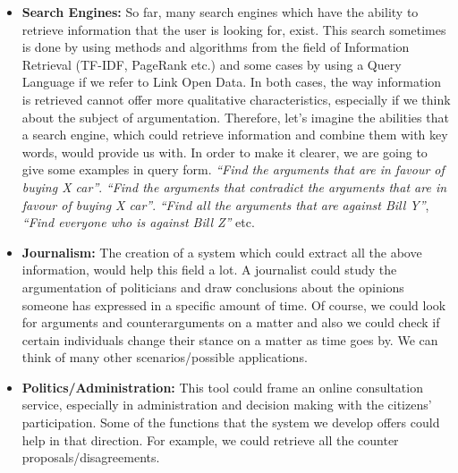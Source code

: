 \begin{itemize}

	\item \textbf{Search Engines:} So far, many search engines which have the ability to retrieve information that the user is looking for, exist. This search sometimes is done by using methods and algorithms from the field of Information Retrieval (TF-IDF, PageRank etc.) and some cases by using a Query Language if we refer to Link Open Data. In both cases, the way information is retrieved cannot offer more qualitative characteristics, especially if we think about the subject of argumentation. Therefore, let's imagine the abilities that a search engine, which could retrieve information and combine them with key words, would  provide us with. In order to make it clearer, we are going to give some examples in query form. \textit{``Find the arguments that are in favour of buying X car''}. \textit{``Find the arguments that contradict the arguments that are in favour of buying X car''}. \textit{``Find all the arguments that are against Bill Y''}, \textit{``Find everyone who is against Bill Z''} etc. \cite{1}
	\item \textbf{Journalism:} The creation of a system which could extract all the above information, would help this field a lot. A journalist could study the argumentation of politicians and draw conclusions about the opinions someone has expressed  in a specific amount of time. Of course, we could look for arguments and counterarguments on a matter and also we could check if certain individuals change their stance on a matter as time goes by. We can think of many other scenarios/possible applications.
	\item \textbf{Politics/Administration:} This tool could frame an online consultation service, especially in administration and decision making with the citizens' participation. Some of the functions that the system we develop offers could help in that direction. For example, we could retrieve all the counter proposals/disagreements.\\

\end{itemize}

